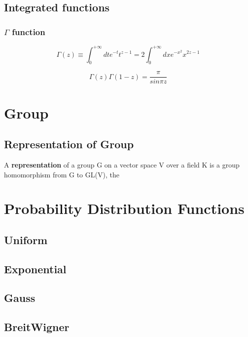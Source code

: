\subsection{Integrated functions}
\subsubsection{$\Gamma$ function}
\[\Gamma(z) \equiv \int_{0}^{+\infty}dt e^{-t} t^{z-1} =
2\int_{0}^{+\infty}dx e^{-x^2}x^{2z-1}\]

\[\Gamma(z)\Gamma(1-z) = \frac{\pi}{sin\pi z}\]

\section{Group}

\subsection{Representation of Group}
A \textbf{representation} of a group G on a vector space V over a field K is
a group homomorphism from G to GL(V), the 

\section{Probability Distribution Functions}

\subsection{Uniform}

\subsection{Exponential}

\subsection{Gauss}

\subsection{BreitWigner}

